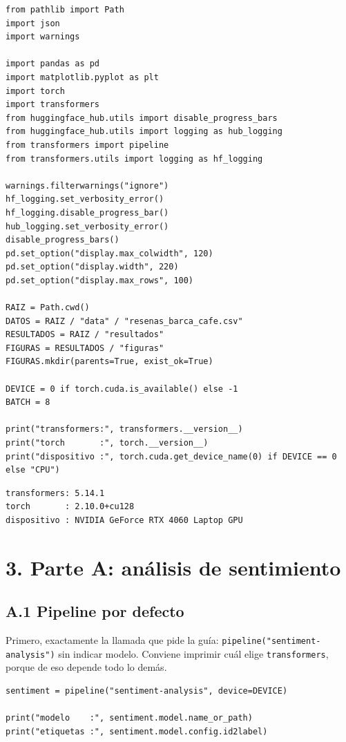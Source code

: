 \documentclass[12pt,a4paper]{article}
\begin{document}
\begin{lstlisting}[style=codigo]
from pathlib import Path
import json
import warnings

import pandas as pd
import matplotlib.pyplot as plt
import torch
import transformers
from huggingface_hub.utils import disable_progress_bars
from huggingface_hub.utils import logging as hub_logging
from transformers import pipeline
from transformers.utils import logging as hf_logging

warnings.filterwarnings("ignore")
hf_logging.set_verbosity_error()
hf_logging.disable_progress_bar()
hub_logging.set_verbosity_error()
disable_progress_bars()
pd.set_option("display.max_colwidth", 120)
pd.set_option("display.width", 220)
pd.set_option("display.max_rows", 100)

RAIZ = Path.cwd()
DATOS = RAIZ / "data" / "resenas_barca_cafe.csv"
RESULTADOS = RAIZ / "resultados"
FIGURAS = RESULTADOS / "figuras"
FIGURAS.mkdir(parents=True, exist_ok=True)

DEVICE = 0 if torch.cuda.is_available() else -1
BATCH = 8

print("transformers:", transformers.__version__)
print("torch       :", torch.__version__)
print("dispositivo :", torch.cuda.get_device_name(0) if DEVICE == 0 else "CPU")
\end{lstlisting}

\begin{lstlisting}[style=salida]
transformers: 5.14.1
torch       : 2.10.0+cu128
dispositivo : NVIDIA GeForce RTX 4060 Laptop GPU
\end{lstlisting}


\section{3. Parte A: análisis de sentimiento}

\subsection{A.1 Pipeline por defecto}

Primero, exactamente la llamada que pide la guía: \texttt{pipeline("sentiment-analysis")} sin
indicar modelo. Conviene imprimir cuál elige \texttt{transformers}, porque de eso depende todo lo
demás.

\begin{lstlisting}[style=codigo]
sentiment = pipeline("sentiment-analysis", device=DEVICE)

print("modelo    :", sentiment.model.name_or_path)
print("etiquetas :", sentiment.model.config.id2label)
\end{lstlisting}
\end{document}
